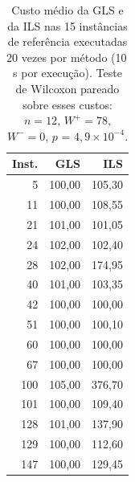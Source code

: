\begin{table}[htbp]
\centering
\caption{Custo médio da GLS e da ILS nas 15 instâncias de referência executadas 20 vezes por método (10\,s por execução). Teste de Wilcoxon pareado sobre esses custos: $n = 12$, $W^{+} = 78$, $W^{-} = 0$, $p$ = $4{,}9 \times 10^{-4}$.}
\label{tab:wilcoxon}
\begin{tabular}{rrr}
\toprule
Inst. & GLS & ILS \\
\midrule
5 & 100,00 & 105,30 \\
11 & 100,00 & 108,55 \\
21 & 101,00 & 101,05 \\
24 & 102,00 & 102,40 \\
28 & 102,00 & 174,95 \\
40 & 101,00 & 103,35 \\
42 & 100,00 & 100,00 \\
51 & 100,00 & 100,10 \\
60 & 100,00 & 100,00 \\
67 & 100,00 & 100,00 \\
100 & 105,00 & 376,70 \\
101 & 100,00 & 109,40 \\
128 & 101,00 & 137,90 \\
129 & 100,00 & 112,60 \\
147 & 100,00 & 129,45 \\
\bottomrule
\end{tabular}
\end{table}
